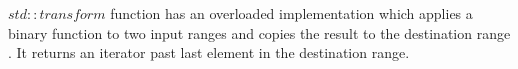 \documentclass[12pt,fleqn]{article}
\begin{document}
\begin{comment}
\begin{lstlisting}[caption=using std;:bind to combine functions, label=combine ]
[...]
std::function< std::function <int(int)>(int)> cplus   = [] (int x) {
    return [=] (int y) {
      return 4 * x + y;
    };
  };

 auto l = std::bind([](std::function<int(int)> f){return f(2);},
		     std::bind(cplus, std::placeholders::_1));

  map(show, map(l, L)); //prints 6,270,358,94,182,6,14,398,-358,

\end{lstlisting}
Listing \ref{combine} illustrates how function combination can be used to limit the number of iterations and list copies.
The resulting function $l$ is then mapped over list $L$.
The inner bind takes the function $cplus$ as the first argument and has a placeholder $\_1$ as the second argument.
The callable object returned by the inner bind is then used as the argument input to the function of the outer bind. 
The function of the outer bind is a lambda which has a function as input.
In the body of the lambda this function is called with 2 and it's result is returned.
The resulting callable object $l$ is the function is $f(x)\ = 4 * x + 2$.
The placeholder is bound to the first argument of $cplus$ and 2 is used as the value for the second argument.
The result of mapping is printed to std::cout and the output is shown in the comment. 
Note that 94 the result of 4 * 23 + 2, 182 the result of 4 * 45 + 2 etc.
\end{comment}
%
%
$std::transform$ function has an overloaded implementation which applies a binary function to two input ranges and copies the result to the destination range \cite{jouttis, std::transform}. 
It returns an iterator past last element in the destination range.
\begin{comment}
\[
\begin{array}{rll}
\mbox{\bf template}<& \mbox{\bf typename}\; input\_container\_iterator_1, \\
                &\mbox{\bf typename}\; input\_container\_iterator_2, \\
               &\mbox{\bf typename} \; output \_container\_iterator, \\
             &\mbox{\bf typename} \; binary\_operation> &\\
output\_container\_iterator\;& \mbox{\bf transform}\\
&( input\_container\_iterator_1\; begin_1, \\
& input\_container\_iterator_1 \; end_1, \\
&input\_container\_iterator_2\; begin_2, \\
& output\_container\_iterator \; destination_1, \\
& binary\_operation \; binary_{op} );
\end{array}
\]
%
\end{comment}
\end{document}
